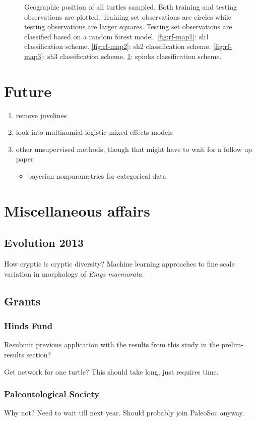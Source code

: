 \documentclass{article}\usepackage{graphicx, color}
\begin{document}
\begin{figure}[t]
\begin{subfigure}[b]{0.5\textwidth}
    \label{fig:rf-map4}
  \end{subfigure}
  \caption{Geographic position of all turtles sampled. Both training and testing observations are plotted. Training set observations are circles while testing observations are larger squares. Testing set observations are classified based on a random forest model. \ref{fig:rf-map1}: sh1 classification scheme. \ref{fig:rf-map2}: sh2 classification scheme. \ref{fig:rf-map3}: sh3 classification scheme. \ref{fig:rf-map4}: spinks classification scheme.}
  \label{fig:rf-map}
\end{figure}


\section{Future}
\begin{enumerate}
  \item remove juvelines
  \item look into multinomial logistic mixed-effects models
  \item other unsupervised methods, though that might have to wait for a follow up paper
    \begin{itemize}
      \item bayesian nonparametrics for categorical data
    \end{itemize}
\end{enumerate}


\section{Miscellaneous affairs}
\subsection{Evolution 2013}
How cryptic is cryptic diversity? Machine learning approaches to fine scale variation in morphology of \textit{Emys marmorata}.


\subsection{Grants}
\subsubsection{Hinds Fund}
Resubmit previous application with the results from this study in the prelim-results section?

Get network for one turtle? This should take long, just requires time.

\subsubsection{Paleontological Society}
Why not? Need to wait till next year. Should probably join PaleoSoc anyway.
\end{document}
